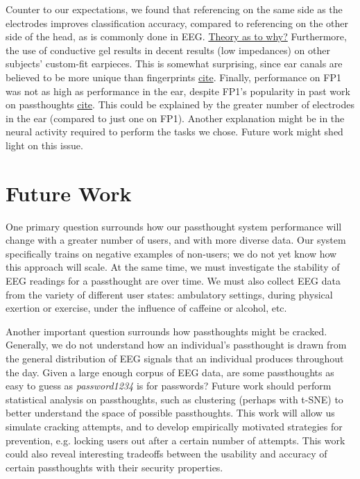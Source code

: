 \documentclass[letterpaper,twocolumn,10pt]{article}
\begin{document}
Counter to our expectations, we found that referencing on the same side as the electrodes improves classification accuracy, compared to referencing on the other side of the head, as is commonly done in EEG. \underline{Theory as to why?} Furthermore, the use of conductive gel results in decent results (low impedances) on other subjects' custom-fit earpieces. This is somewhat surprising, since ear canals are believed to be more unique than fingerprints \underline{cite}. Finally, performance on FP1 was not as high as performance in the ear, despite FP1's popularity in past work on passthoughts \underline{cite}. This could be explained by the greater number of electrodes in the ear (compared to just one on FP1). Another explanation might be in the neural activity required to perform the tasks we chose. Future work might shed light on this issue.


\section{Future Work}

One primary question surrounds how our passthought system performance will change with a greater number of users, and with more diverse data. Our system specifically trains on negative examples of non-users; we do not yet know how this approach will scale. At the same time, we must investigate the stability of EEG readings for a passthought are over time. We must also collect EEG data from the variety of different user states: ambulatory settings, during physical exertion or exercise, under the influence of caffeine or alcohol, etc.

Another important question surrounds how passthoughts might be cracked.
Generally, we do not understand how an individual's passthought is drawn from the general distribution of EEG signals that an individual produces throughout the day.
Given a large enough corpus of EEG data, are some passthoughts as easy to guess as \textit{password1234} is for passwords?
Future work should perform statistical analysis on passthoughts, such as clustering (perhaps with t-SNE) to better understand the space of possible passthoughts.
This work will allow us simulate cracking attempts, and to develop empirically motivated strategies for prevention, e.g. locking users out after a certain number of attempts.
This work could also reveal interesting tradeoffs between the usability and accuracy of certain passthoughts with their security properties.
\end{document}
